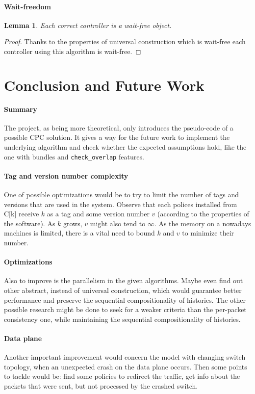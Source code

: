 \documentclass{article}
\newtheorem{lemma}{Lemma}
\theoremstyle{remark}
\begin{document}
\paragraph{Wait-freedom}
\begin{lemma}
Each correct controller is a wait-free object.
\end{lemma}
\begin{proof}
Thanks to the properties of universal construction which is wait-free each controller using this algorithm is wait-free.
\end{proof}
%
%
\section{Conclusion and Future Work}
\paragraph{Summary} The project, as being more theoretical, only introduces the pseudo-code of a possible CPC solution. It gives a way for the future work to implement the underlying algorithm and check whether the expected assumptions hold, like the one with bundles and \texttt{check\_overlap} features.
\paragraph{Tag and version number complexity}
One of possible optimizations would be to try to limit the number of tags and versions that are used in the system. Observe that each polices installed from C[k] receive $k$ as a tag and some version number $v$ (according to the properties of the software). As $k$ grows, $v$ might also tend to $\infty$. As the memory on a nowadays machines is limited, there is a vital need to bound $k$ and $v$ to minimize their number.
\paragraph{Optimizations}
Also to improve is the parallelism in the given algorithms. Maybe even find out other abstract, instead of universal construction, which would guarantee better performance and preserve the sequential compositionality of histories.
The other possible research might be done to seek for a weaker criteria than the per-packet consistency one, while maintaining the sequential compositionality of histories.
\paragraph{Data plane}
Another important improvement would concern the model with changing switch topology, when an unexpected crash on the data plane occurs. Then some points to tackle would be: find some policies to redirect the traffic, get info about the packets that were sent, but not processed by the crashed switch. 
\end{document}
